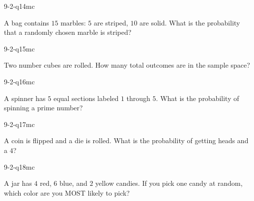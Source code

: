 \begin{practiceQuestion}{9-2-q14}{mc}
\begin{questionText}
A bag contains $15$ marbles: $5$ are striped, $10$ are solid. What is the probability that a randomly chosen marble is striped?
\end{questionText}
\end{practiceQuestion}

\begin{practiceQuestion}{9-2-q15}{mc}
\begin{questionText}
Two number cubes are rolled. How many total outcomes are in the sample space?
\end{questionText}
\end{practiceQuestion}

\begin{practiceQuestion}{9-2-q16}{mc}
\begin{questionText}
A spinner has $5$ equal sections labeled $1$ through $5$. What is the probability of spinning a prime number?
\end{questionText}
\end{practiceQuestion}

\begin{practiceQuestion}{9-2-q17}{mc}
\begin{questionText}
A coin is flipped and a die is rolled. What is the probability of getting heads and a $4$?
\end{questionText}
\end{practiceQuestion}

\begin{practiceQuestion}{9-2-q18}{mc}
\begin{questionText}
A jar has $4$ red, $6$ blue, and $2$ yellow candies. If you pick one candy at random, which color are you MOST likely to pick?
\end{questionText}
\end{practiceQuestion}

